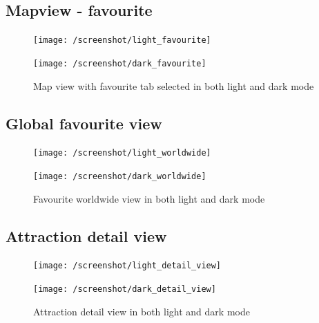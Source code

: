 \documentclass[a4paper, 11pt, parskip=half]{scrreprt}
\theoremstyle{definition}
\begin{document}
\subsection{Mapview - favourite}
\begin{figure}[H]
	\centering
	\begin{minipage}{.5\textwidth}
  	\centering
  	\texttt{[image: /screenshot/light\_favourite]}
  	\label{fig:test1}
	\end{minipage}%
	\begin{minipage}{.5\textwidth}
  	\centering
  	\texttt{[image: /screenshot/dark\_favourite]}
  	\label{fig:test2}
	\end{minipage}
	\caption{Map view with favourite tab selected in both light and dark mode}
\end{figure}

\subsection{Global favourite view}
\begin{figure}[H]
	\centering
	\begin{minipage}{.5\textwidth}
  	\centering
  	\texttt{[image: /screenshot/light\_worldwide]}
  	\label{fig:test1}
	\end{minipage}%
	\begin{minipage}{.5\textwidth}
  	\centering
  	\texttt{[image: /screenshot/dark\_worldwide]}
  	\label{fig:test2}
	\end{minipage}
	\caption{Favourite worldwide view in both light and dark mode}
\end{figure}

\subsection{Attraction detail view}
\begin{figure}[H]
	\centering
	\begin{minipage}{.5\textwidth}
  	\centering
  	\texttt{[image: /screenshot/light\_detail\_view]}
  	\label{fig:test1}
	\end{minipage}%
	\begin{minipage}{.5\textwidth}
  	\centering
  	\texttt{[image: /screenshot/dark\_detail\_view]}
  	\label{fig:test2}
	\end{minipage}
	\caption{Attraction detail view in both light and dark mode}
\end{figure}
\end{document}

